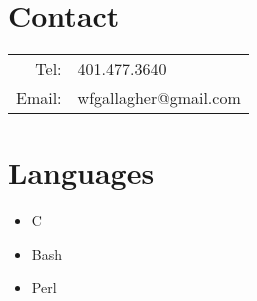 \documentclass[10pt,a4paper]{article}
\begin{document}
{\begin{tcolorbox}
  \section*{Contact}
  \begin{tabular}{r l}
    Tel: & 401.477.3640 \\
    Email: & wfgallagher@gmail.com \\
  \end{tabular}

  \section*{Languages}
  \begin{itemize}
    \item{C}
    \item{Bash}
    \item{Perl}
  \end{itemize}

\end{tcolorbox}
}
\end{document}
